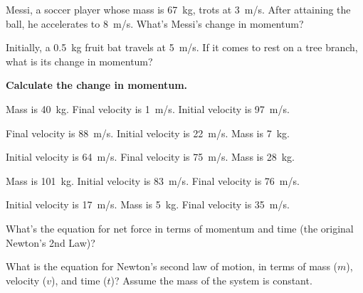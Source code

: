 \documentclass[main.tex]{subfiles}
\begin{document}
\begin{exercise} \label{Isttuf}
    Messi, a soccer player whose mass is \SI{67}{kg}, trots at \SI{3}{m/s}. After attaining the ball, he accelerates to \SI{8}{m/s}. What's Messi's change in momentum? 
\end{exercise}

\begin{exercise} \label{1vMk6B}
    Initially, a \SI{0.5}{kg} fruit bat travels at \SI{5}{m/s}. If it comes to rest on a tree branch, what is its change in momentum?
\end{exercise}

\cyanhrule

\vspace{1em}

\textbf{Calculate the change in momentum.}

\begin{exercise} \label{VtoBkS}
    Mass is \SI{40}{kg}. Final velocity is \SI{1}{m/s}. Initial velocity is \SI{97}{m/s}.
\end{exercise}

\begin{exercise} \label{fhENr6}
    Final velocity is \SI{88}{m/s}. Initial velocity is \SI{22}{m/s}. Mass is \SI{7}{kg}.
\end{exercise}

\begin{exercise} \label{MqRZuz}
     Initial velocity is \SI{64}{m/s}. Final velocity is \SI{75}{m/s}. Mass is \SI{28}{kg}.
\end{exercise}

\begin{exercise} \label{qSPMmV}
    Mass is \SI{101}{kg}. Initial velocity is \SI{83}{m/s}. Final velocity is \SI{76}{m/s}. 
\end{exercise}

\begin{exercise} \label{4phY3A}
    Initial velocity is \SI{17}{m/s}. Mass is \SI{5}{kg}. Final velocity is \SI{35}{m/s}. 
\end{exercise}

\cyanhrule

\begin{exercise}
    What's the equation for net force in terms of momentum and time (the original Newton's 2nd Law)?
\end{exercise}

\begin{exercise} \label{9CaNPq}
    What is the equation for Newton's second law of motion, in terms of mass ($m$), velocity ($v$), and time ($t$)? Assume the mass of the system is constant.
\end{exercise}
\end{document}
